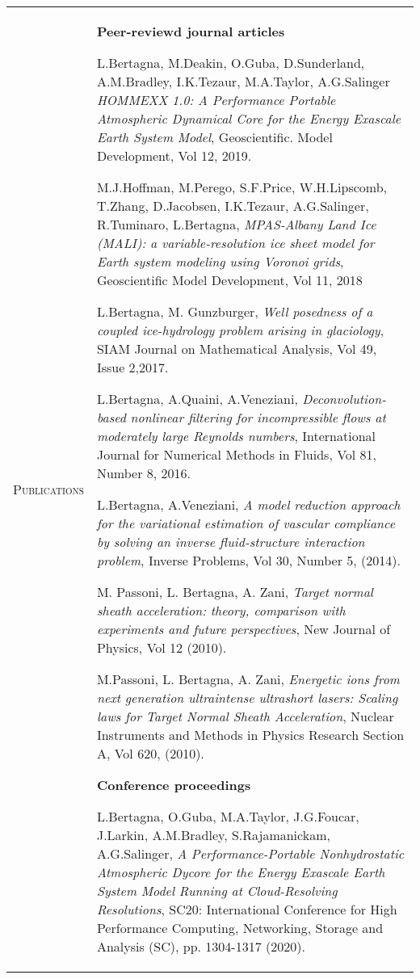 \documentclass[10pt]{article}
\begin{document}
\newpage
\begin{tabular}{p{2.5cm}|p{15.5cm}}
\textsc{Publications} & \textbf{Peer-reviewd journal articles}
\vspace*{0.2cm}

L.Bertagna, M.Deakin, O.Guba, D.Sunderland, A.M.Bradley, I.K.Tezaur, M.A.Taylor, A.G.Salinger \textit{HOMMEXX 1.0: A Performance Portable Atmospheric Dynamical Core for the Energy Exascale Earth System Model}, Geoscientific. Model Development, Vol 12, 2019.
\vspace*{0.2cm}

M.J.Hoffman, M.Perego, S.F.Price, W.H.Lipscomb, T.Zhang, D.Jacobsen, I.K.Tezaur, A.G.Salinger, R.Tuminaro, L.Bertagna, \textit{MPAS-Albany Land Ice (MALI): a variable-resolution ice sheet model for Earth system modeling using Voronoi grids}, Geoscientific Model Development, Vol 11, 2018
\vspace*{0.2cm}

L.Bertagna, M. Gunzburger, \textit{Well posedness of a coupled ice-hydrology problem arising in glaciology}, SIAM Journal on Mathematical Analysis, Vol 49, Issue 2,2017.
\vspace*{0.2cm}

L.Bertagna, A.Quaini, A.Veneziani, \textit{Deconvolution-based nonlinear filtering for incompressible flows at moderately large Reynolds numbers}, International Journal for Numerical Methods in Fluids, Vol 81, Number 8, 2016.
\vspace*{0.2cm}

L.Bertagna, A.Veneziani, \textit{A model reduction approach for the variational estimation of vascular compliance by solving an inverse fluid-structure interaction problem}, Inverse Problems, Vol 30, Number 5, (2014).
\vspace*{0.2cm}

M. Passoni, L. Bertagna, A. Zani, \textit{Target normal sheath acceleration: theory, comparison with experiments and future perspectives}, New Journal of Physics, Vol 12 (2010).
\vspace*{0.2cm}

M.Passoni, L. Bertagna, A. Zani, \textit{Energetic ions from next generation ultraintense ultrashort lasers: Scaling laws for Target Normal Sheath Acceleration}, Nuclear Instruments and Methods in Physics Research Section A, Vol 620, (2010).
\vspace*{0.2cm}

\textbf{Conference proceedings}

\vspace*{0.2cm}
L.Bertagna, O.Guba, M.A.Taylor, J.G.Foucar, J.Larkin, A.M.Bradley, S.Rajamanickam, A.G.Salinger, \textit{A Performance-Portable Nonhydrostatic Atmospheric Dycore for the Energy Exascale Earth System Model Running at Cloud-Resolving Resolutions}, SC20: International Conference for High Performance Computing, Networking, Storage and Analysis (SC), pp. 1304-1317 (2020).


\end{tabular}
\end{document}

